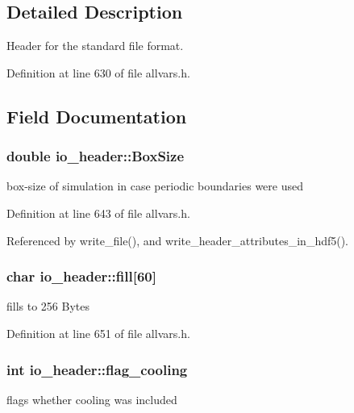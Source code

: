 \subsection{Detailed Description}
Header for the standard file format. 

Definition at line 630 of file allvars.h.



\subsection{Field Documentation}
\hypertarget{structio__header_aacb7ba10d16ae90490a9deba37ace731}{
\subsubsection[{BoxSize}]{\setlength{\rightskip}{0pt plus 5cm}double {\bf io\_\-header::BoxSize}}}
\label{structio__header_aacb7ba10d16ae90490a9deba37ace731}
box-\/size of simulation in case periodic boundaries were used 

Definition at line 643 of file allvars.h.



Referenced by write\_\-file(), and write\_\-header\_\-attributes\_\-in\_\-hdf5().

\hypertarget{structio__header_ac458badfa44878ddc5deb856531a2ee2}{
\subsubsection[{fill}]{\setlength{\rightskip}{0pt plus 5cm}char {\bf io\_\-header::fill}\mbox{[}60\mbox{]}}}
\label{structio__header_ac458badfa44878ddc5deb856531a2ee2}
fills to 256 Bytes 

Definition at line 651 of file allvars.h.

\hypertarget{structio__header_ae877c2fcde2f096886193c22b9b73cbf}{
\subsubsection[{flag\_\-cooling}]{\setlength{\rightskip}{0pt plus 5cm}int {\bf io\_\-header::flag\_\-cooling}}}
\label{structio__header_ae877c2fcde2f096886193c22b9b73cbf}
flags whether cooling was included 

